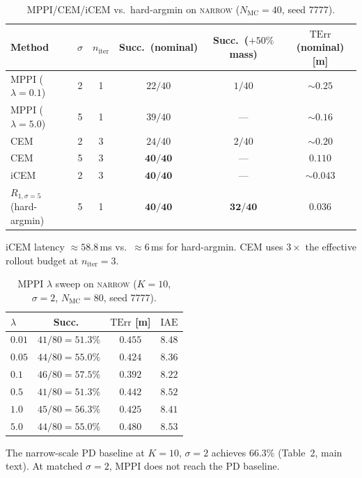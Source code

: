 \documentclass[11pt,a4paper]{article}
\newcommand{\Nm}{N_{\mathrm{MC}}}
\newcommand{\TErr}{\mathrm{TErr}}
\newcommand{\IAE}{\mathrm{IAE}}
\begin{document}
\begin{table}[h]
\centering
\caption{MPPI/CEM/iCEM vs.\ hard-argmin on \textsc{narrow}
($\Nm = 40$, seed 7777).}\label{tab:s2-sigma}
\begin{tabular}{lccccc}
\toprule
Method & $\sigma$ & $n_{\mathrm{iter}}$ & Succ.\ (nominal) &
Succ.\ ($+50\%$ mass) & $\TErr$ (nominal) [m] \\
\midrule
MPPI ($\lambda = 0.1$) & 2 & 1 & $22/40$ & $1/40$ & $\sim 0.25$ \\
MPPI ($\lambda = 5.0$) & 5 & 1 & $39/40$ & --- & $\sim 0.16$ \\
CEM & 2 & 3 & $24/40$ & $2/40$ & $\sim 0.20$ \\
CEM & 5 & 3 & $\mathbf{40/40}$ & --- & $0.110$ \\
iCEM & 2 & 3 & $\mathbf{40/40}$ & --- & $\sim 0.043$ \\
$R_{1,\sigma=5}$ (hard-argmin) & 5 & 1 & $\mathbf{40/40}$ & $\mathbf{32/40}$ & $\mathbf{0.036}$ \\
\bottomrule
\end{tabular}
\par\smallskip
iCEM latency $\approx 58.8$\,ms vs.\ $\approx 6$\,ms for hard-argmin.
CEM uses $3\times$ the effective rollout budget at $n_{\mathrm{iter}} = 3$.
\end{table}

\begin{table}[h]
\centering
\caption{MPPI $\lambda$ sweep on \textsc{narrow}
($K = 10$, $\sigma = 2$, $\Nm = 80$, seed 7777).}\label{tab:s2-lambda}
\begin{tabular}{lccc}
\toprule
$\lambda$ & Succ.\ & $\TErr$ [m] & $\IAE$ \\
\midrule
$0.01$ & $41/80 = 51.3\%$ & $0.455$ & $8.48$ \\
$0.05$ & $44/80 = 55.0\%$ & $0.424$ & $8.36$ \\
$0.1$  & $46/80 = 57.5\%$ & $0.392$ & $8.22$ \\
$0.5$  & $41/80 = 51.3\%$ & $0.442$ & $8.52$ \\
$1.0$  & $45/80 = 56.3\%$ & $0.425$ & $8.41$ \\
$5.0$  & $44/80 = 55.0\%$ & $0.480$ & $8.53$ \\
\bottomrule
\end{tabular}
\par\smallskip
The narrow-scale PD baseline at $K = 10$, $\sigma = 2$ achieves
$66.3\%$ (Table~2, main text). At matched $\sigma = 2$, MPPI does not
reach the PD baseline.
\end{table}
\end{document}
